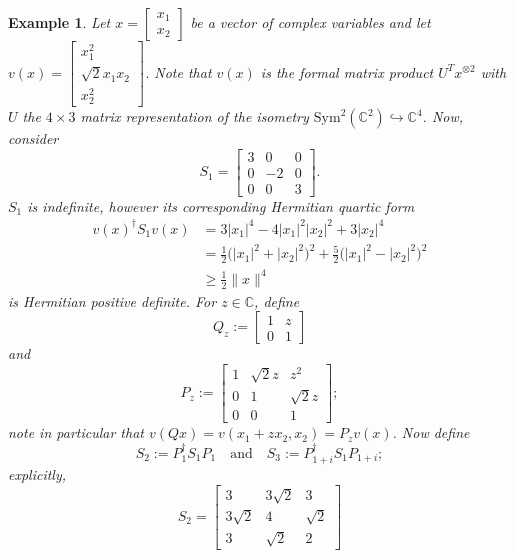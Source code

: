 \documentclass[11pt]{article}
\newtheorem{example}[theorem]{Example}
\begin{document}
\begin{example}\label{Contraction Induced Quartic Example}
    Let $x = \left[\begin{array}{c}
        x_1 \\
        x_2
    \end{array}\right]$ be a vector of complex variables and let $v(x) = \left[\begin{array}{c}
        x_1^2 \\
        \sqrt{2}x_1x_2 \\
        x_2^2
    \end{array}\right]$. Note that $v(x)$ is the formal matrix product $U^Tx^{\otimes 2}$ with $U$ the $4\times 3$ matrix representation of the isometry $\mathrm{Sym}^2(\mathbb{C}^2)\hookrightarrow \mathbb{C}^4$. Now, consider  
    \[S_1 = \left[\begin{array}{ccc}
        3 & 0 & 0 \\
        0 & -2 & 0 \\
        0 & 0 & 3
    \end{array}\right].\]
    $S_1$ is indefinite, however its corresponding Hermitian quartic form
    \begin{align*}
        v(x)^{\dagger}S_1v(x) &= 3|x_1|^4-4|x_1|^2|x_2|^2+3|x_2|^4 \\
        &= \frac{1}{2}\big(|x_1|^2+|x_2|^2\big)^2+\frac{5}{2}\big(|x_1|^2-|x_2|^2\big)^2 \\
        &\geq \frac{1}{2}\|x\|^4
    \end{align*}
    is Hermitian positive definite. For $z\in\mathbb{C}$, define 
    \[Q_z := \left[\begin{array}{cc}
        1 & z \\
        0 & 1
    \end{array}\right]\]
    and 
    \[P_z := \left[\begin{array}{ccc}
        1 & \sqrt{2}z & z^2 \\
        0 & 1 & \sqrt{2}z \\
        0 & 0 & 1
    \end{array}\right];\]
    note in particular that $v(Qx) = v(x_1+zx_2,x_2) = P_zv(x)$. Now define   
    \[S_2 := P_1^{\dagger}S_1P_1\quad\text{and}\quad S_3 := P_{1+i}^{\dagger}S_1P_{1+i};\]
    explicitly, 
    \[S_2 = \left[\begin{array}{ccc}
        3 & 3\sqrt{2} & 3 \\
        3\sqrt{2} & 4 & \sqrt{2} \\
        3 & \sqrt{2} & 2
    \end{array}\right]\]

\end{example}
\end{document}
